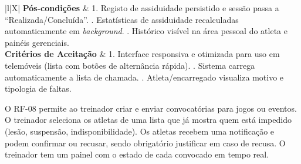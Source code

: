 {\begin{xltabular}{\textwidth}{|l|X|}
\textbf{Pós-condições} & 1. Registo de assiduidade persistido e sessão passa a ``Realizada/Concluída''. . Estatísticas de assiduidade recalculadas automaticamente em \textit{background}. . Histórico visível na área pessoal do atleta e painéis gerenciais. \\ \hline
\textbf{Critérios de Aceitação} & 1. Interface responsiva e otimizada para uso em telemóveis (lista com botões de alternância rápida). . Sistema carrega automaticamente a lista de chamada. . Atleta/encarregado visualiza motivo e tipologia de faltas. \\
\end{xltabular}
}


O RF-08 permite ao treinador criar e enviar convocatórias para jogos ou eventos. O treinador seleciona os atletas de uma lista que já mostra quem está impedido (lesão, suspensão, indisponibilidade). Os atletas recebem uma notificação e podem confirmar ou recusar, sendo obrigatório justificar em caso de recusa. O treinador tem um painel com o estado de cada convocado em tempo real.

